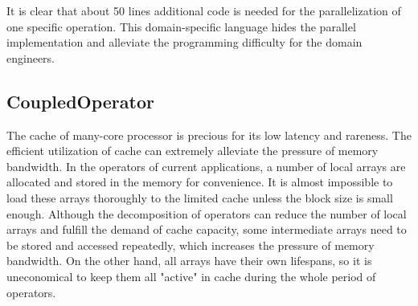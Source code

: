 \documentclass[5p,times]{elsarticle}
\begin{document}
It is clear that about 50 lines additional code is needed for the parallelization of one specific operation. This domain-specific language hides the parallel implementation and alleviate the programming difficulty for the domain engineers.

\subsection{CoupledOperator}

The cache of many-core processor is precious for its low latency and rareness. The efficient utilization of cache can extremely alleviate the pressure of memory bandwidth. In the operators of current applications, a number of local arrays are allocated and stored in the memory for convenience. It is almost impossible to load these arrays thoroughly to the limited cache unless the block size is small enough. Although the decomposition of operators can reduce the number of local arrays and fulfill the demand of cache capacity, some intermediate arrays need to be stored and accessed repeatedly, which increases the pressure of memory bandwidth. On the other hand, all arrays have their own lifespans, so it is uneconomical to keep them all "active" in cache during the whole period of operators.
\end{document}
